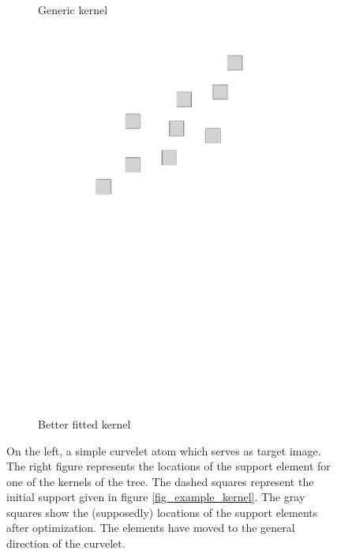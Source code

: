 \begin{figure}[!ht]
\begin{subfigure}[b]{0.32\textwidth}
	\caption{Generic kernel}
\end{subfigure}
\begin{subfigure}[b]{0.32\textwidth}\centering
	\includegraphics[width=\textwidth]{figures/manual-better-support/support-better.pdf}
	\caption{Better fitted kernel}
\end{subfigure}
\caption{On the left, a simple curvelet atom which serves as target image. The right figure represents the locations of the support element for one of the kernels of the tree. The dashed squares represent the initial support given in figure \ref{fig_example_kernel}. The gray squares show the (supposedly) locations of the support elements after optimization. The elements have moved to the general direction of the curvelet.} \label{fig_fixed_vs_expected}
\end{figure}

